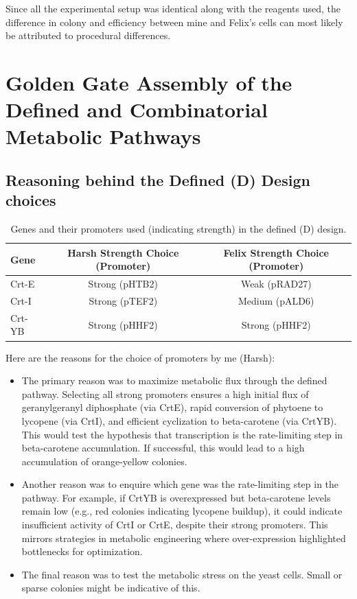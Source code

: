 \documentclass[12pt,a4paper]{article}
\begin{document}
Since all the experimental setup was identical along with the reagents used,
the difference in colony and efficiency between mine and Felix's cells can most
likely be attributed to procedural differences.

\section{Golden Gate Assembly of the Defined and Combinatorial Metabolic Pathways}

\subsection{Reasoning behind the Defined (D) Design choices}
\begin{table}[h]
    \centering
    \begin{tabular}{|l|c|c|}
        \hline
        \textbf{Gene} & Harsh Strength Choice (Promoter) & Felix Strength Choice (Promoter) \\
        \hline
        Crt-E         & Strong (pHTB2)                   & Weak (pRAD27)                    \\
        \hline
        Crt-I         & Strong (pTEF2)                   & Medium (pALD6)                   \\
        \hline
        Crt-YB        & Strong (pHHF2)                   & Strong (pHHF2)                   \\
        \hline
    \end{tabular}
    \caption{\centering Genes and their promoters used (indicating strength) in the defined (D) design.}\label{tab:defined_design}
\end{table}

Here are the reasons for the choice of promoters by me (Harsh):
\begin{itemize}
    \item The primary reason was to maximize metabolic flux through the defined pathway.
          Selecting all strong promoters ensures a high initial flux of geranylgeranyl
          diphosphate (via CrtE), rapid conversion of phytoene to lycopene (via CrtI),
          and efficient cyclization to beta-carotene (via CrtYB). This would test the
          hypothesis that transcription is the rate-limiting step in beta-carotene
          accumulation. If successful, this would lead to a high accumulation of
          orange-yellow colonies.
    \item Another reason was to enquire which gene was the rate-limiting step in the
          pathway. For example, if CrtYB is overexpressed but beta-carotene levels remain
          low (e.g., red colonies indicating lycopene buildup), it could indicate
          insufficient activity of CrtI or CrtE, despite their strong promoters. This
          mirrors strategies in metabolic engineering where over-expression highlighted
          bottlenecks for optimization.
    \item The final reason was to test the metabolic stress on the yeast cells. Small or
          sparse colonies might be indicative of this.
\end{itemize}
\end{document}
